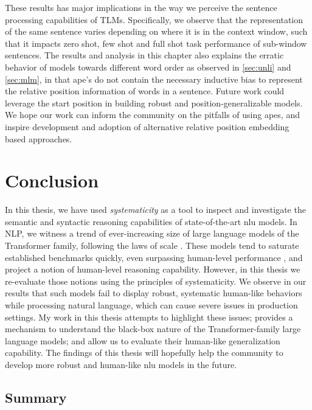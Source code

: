 \documentclass[letterpaper, 12pt]{report}
\begin{document}
These results has major implications in the way we perceive the sentence processing capabilities of TLMs.
Specifically, we observe that the representation of the same sentence varies depending on where it is in the context window, such that it impacts zero shot, few shot and full shot task performance of sub-window sentences.
The results and analysis in this chapter also explains the erratic behavior of models towards different word order as observed in \autoref{sec:unli} and \autoref{sec:mlm}, in that \acrshort{ape}'s do not contain the necessary inductive bias to represent the relative position information of words in a sentence.
Future work could leverage the start position in building robust and position-generalizable models.
We hope our work can inform the community on the pitfalls of using \acrshort{ape}s, and inspire development and adoption of alternative relative position embedding based approaches.



\clearpage

\chapter{Conclusion}
\label{chap:conclusion}

In this thesis, we have used \textit{systematicity} as a tool to inspect and investigate the semantic and syntactic reasoning capabilities of state-of-the-art \acrshort{nlu} models. In NLP, we witness a trend of ever-increasing size of large language models of the Transformer family, following the laws of scale \citep{kaplan2020scaling}. These models tend to saturate established benchmarks quickly, even surpassing human-level performance \citep{kiela-etal-2021-dynabench}, and project a notion of human-level reasoning capability. However, in this thesis we re-evaluate those notions using the principles of systematicity. We observe in our results that such models fail to display robust, systematic human-like behaviors while processing natural language, which can cause severe issues in production settings.  My work in this thesis attempts to highlight these issues; provides a mechanism to understand the black-box nature of the Transformer-family large language models; and allow us to evaluate their human-like generalization capability. The findings of this thesis will hopefully help the community to develop more robust and human-like \acrshort{nlu} models in the future.

\section{Summary}
\label{sec:conc_summary}
\end{document}
